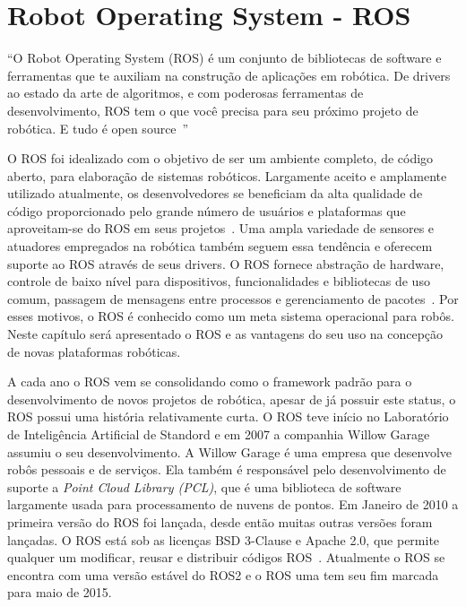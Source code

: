 \chapter{Robot Operating System - ROS}\label{cap:ros}

\begin{citacao}
``O Robot Operating System (ROS) é um conjunto de bibliotecas de software e ferramentas que te auxiliam na construção de aplicações em robótica. De drivers ao estado da arte de algoritmos, e com poderosas ferramentas de desenvolvimento, ROS tem o que você precisa para seu próximo projeto de robótica. E tudo é open source~\cite{Ros}''    
\end{citacao}

O ROS foi idealizado com o objetivo de ser um ambiente completo, de código aberto, para elaboração de sistemas robóticos. Largamente aceito e amplamente utilizado atualmente, os desenvolvedores se beneficiam da alta qualidade de código proporcionado pelo grande número de usuários e plataformas que aproveitam-se do ROS em seus projetos~\cite{RosIntro}. Uma ampla variedade de sensores e atuadores empregados na robótica também seguem essa tendência e oferecem suporte ao ROS através de seus drivers. O ROS fornece abstração de hardware, controle de baixo nível para dispositivos, funcionalidades e bibliotecas de uso comum, passagem de mensagens entre processos e gerenciamento de pacotes~\cite{rosEfetiveProgram}. Por esses motivos, o ROS é conhecido como um meta sistema operacional para robôs. Neste capítulo será apresentado o ROS e as vantagens do seu uso na concepção de novas plataformas robóticas.

A cada ano o ROS vem se consolidando como o framework padrão para o desenvolvimento de novos projetos de robótica, apesar de já possuir este status, o ROS possui uma história relativamente curta. O ROS teve início no Laboratório de Inteligência Artificial de Standord e em 2007 a companhia Willow Garage assumiu o seu desenvolvimento. A Willow Garage é uma empresa que desenvolve robôs pessoais e de serviços. Ela também é responsável pelo desenvolvimento de suporte a \textit{Point Cloud Library (PCL)}, que é uma biblioteca de software largamente usada para processamento de nuvens de pontos. Em Janeiro de 2010 a primeira versão do ROS foi lançada, desde então muitas outras versões foram lançadas. O ROS está sob as licenças BSD 3-Clause e Apache 2.0, que permite qualquer um modificar, reusar e distribuir códigos ROS~\cite{rosPYO}. Atualmente o ROS se encontra com uma versão estável do ROS2 e o ROS uma tem seu fim marcada para maio de 2015.


